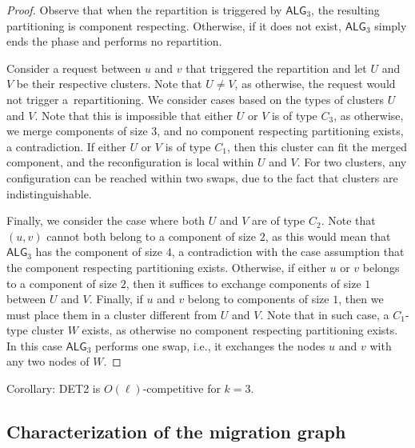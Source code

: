 \documentclass[manuscript,screen=true, review, anonymous]{acmart}
\newcommand{\TAlg}{{\ensuremath{\textsf{ALG}_{3}}}\xspace}
\begin{document}
\begin{proof}
	Observe that when the repartition is triggered by \TAlg, the resulting partitioning is component respecting.
	Otherwise, if it does not exist, \TAlg simply ends the phase and performs no repartition.
	
	
	Consider a request between $u$ and $v$ that triggered the repartition and let $U$ and $V$ be their respective clusters.
	Note that $U\neq V$,
	as otherwise, the request would not trigger a~repartitioning.
	We consider cases based on the types of clusters $U$ and $V$.
	Note that this is impossible that either $U$ or $V$ is of type $C_3$, as otherwise, we merge components of size $3$, and no component respecting partitioning exists, a contradiction.
	If either $U$ or $V$ is of type $C_1$, then this cluster can fit the merged component, and the reconfiguration is local within $U$ and $V$.
	For two clusters, any configuration can be reached within two swaps, due to the fact that clusters are indistinguishable.
	
	Finally, we consider the case where both $U$ and $V$ are of type $C_2$. Note that $(u,v)$ cannot both belong to a component of size $2$, as this would mean that \TAlg has the component of size $4$, a contradiction with the case assumption that the component respecting partitioning exists. 
	Otherwise, if either $u$ or $v$ belongs to a component of size $2$, then it suffices to exchange components of size $1$ between $U$ and $V$.
	Finally, if $u$ and $v$ belong to components of size $1$, then we must place them in a cluster different from $U$ and $V$.
	Note that in such case, a $C_1$-type cluster $W$ exists, as otherwise no component respecting partitioning exists. In this case \TAlg performs one swap, i.e., it exchanges the nodes $u$ and $v$ with any two nodes of $W$.
\end{proof}

Corollary: DET2 is $O(\ell)$-competitive for $k=3$.

\subsection{Characterization of the migration graph}
\end{document}
